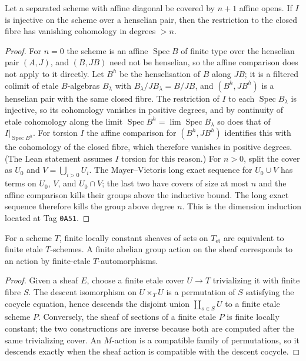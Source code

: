 \begin{lemma}
\label{lemma:weil-pbc-injective-restriction-acyclicity}
\uses{}

Let a separated scheme with affine diagonal be covered by $n+1$ affine opens.
If $I$ is injective on the scheme over a henselian pair, then the restriction
to the closed fibre has vanishing cohomology in degrees $>n$.
\end{lemma}
\begin{proof}

For $n=0$ the scheme is an affine $\operatorname{Spec}B$ of finite type over
the henselian pair $(A,J)$, and $(B,JB)$ need not be henselian, so the affine
comparison does not apply to it directly.  Let $B^h$ be the henselisation of
$B$ along $JB$; it is a filtered colimit of etale $B$-algebras $B_\lambda$ with
$B_\lambda/JB_\lambda=B/JB$, and $(B^h,JB^h)$ is a henselian pair with the
same closed fibre.  The restriction of $I$ to each $\operatorname{Spec}B_\lambda$
is injective, so its cohomology vanishes in positive degrees, and by
continuity of etale cohomology along the limit
$\operatorname{Spec}B^h=\lim\operatorname{Spec}B_\lambda$ so does that of
$I|_{\operatorname{Spec}B^h}$.  For torsion $I$ the affine comparison for
$(B^h,JB^h)$ identifies this with the cohomology of the closed fibre, which
therefore vanishes in positive degrees.  (The Lean statement assumes $I$
torsion for this reason.)  For
$n>0$, split the cover as $U_0$ and $V=\bigcup_{i>0}U_i$.  The Mayer--Vietoris
long exact sequence for $U_0\cup V$ has terms on $U_0$, $V$, and
$U_0\cap V$; the last two have covers of size at most $n$ and the affine
comparison kills their groups above the inductive bound.  The long exact
sequence therefore kills the group above degree $n$.  This is the dimension
induction located at Tag \texttt{0A51}.
\end{proof}

\begin{lemma}
\label{lemma:weil-pbc-finite-locally-constant-etale-equivalence}
\uses{}
For a scheme $T$, finite locally constant sheaves of sets on $T_{\mathrm{et}}$
are equivalent to finite etale $T$-schemes.  A finite abelian group action on
the sheaf corresponds to an action by finite-etale $T$-automorphisms.
\end{lemma}
\begin{proof}
\uses{} 
Given a sheaf $E$, choose a finite etale cover $U\to T$ trivializing it with
finite fibre $S$.  The descent isomorphism on $U\times_TU$ is a permutation
of $S$ satisfying the cocycle equation, hence descends the disjoint union
$\coprod_{s\in S}U$ to a finite etale scheme $P$.  Conversely, the sheaf of
sections of a finite etale $P$ is finite locally constant; the two constructions
are inverse because both are computed after the same trivializing cover.
An $M$-action is a compatible family of permutations, so it descends exactly
when the sheaf action is compatible with the descent cocycle.
\end{proof}

